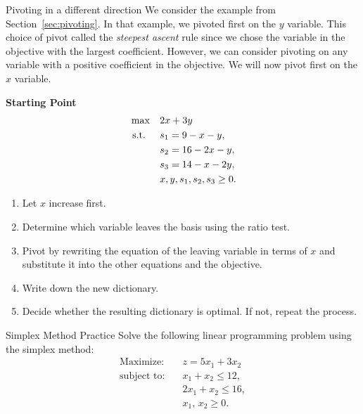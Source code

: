 \begin{ex}{Pivoting in a different direction}{}
\label{ex:alternative-pivot}
 We consider the example from Section~\ref{sec:pivoting}.  In that example, we pivoted first on the $y$ variable.  This choice of pivot called the \emph{steepest ascent} rule since we chose the variable in the objective with the largest coefficient.  
However, we can consider pivoting on any variable with a positive coefficient in the objective.  We will now pivot first on the $x$ variable.  

\textbf{Starting Point}
\[
\begin{aligned}
\max\quad &  2x + 3y \\
\text{ s.t. }\quad & s_1 = 9 - x - y, \\
                        & s_2 = 16 - 2x - y, \\
                        & s_3 = 14 - x - 2y, \\
                        & x, y, s_1, s_2, s_3 \ge 0.
\end{aligned}
\]

\begin{enumerate}
    \item Let \(x\) increase first.
    \item Determine which variable leaves the basis using the ratio test.
    \item Pivot by rewriting the equation of the leaving variable in terms of \(x\) and substitute it into the other equations and the objective.
    \item Write down the new dictionary.
    \item Decide whether the resulting dictionary is optimal. If not, repeat the process.
\end{enumerate}
\exrefs{\S\ref{sec:pivoting}; \S\ref{sec:simplex-algorithm}}
\end{ex}

\begin{ex}{Simplex Method Practice}{}
\label{ex:simplex-practice-5-3}
 Solve the following linear programming problem using the simplex method:
\[
\begin{aligned}
\text{Maximize:}\quad & z = 5x_{1} + 3x_{2}\\
\text{subject to:}\quad & x_{1} + x_{2} \le 12,\\
& 2x_{1} + x_{2} \le 16,\\
& x_{1},\, x_{2} \ge 0.
\end{aligned}
\]
\exrefs{\S\ref{sec:pivoting}; \S\ref{sec:simplex-algorithm}}
\end{ex}

